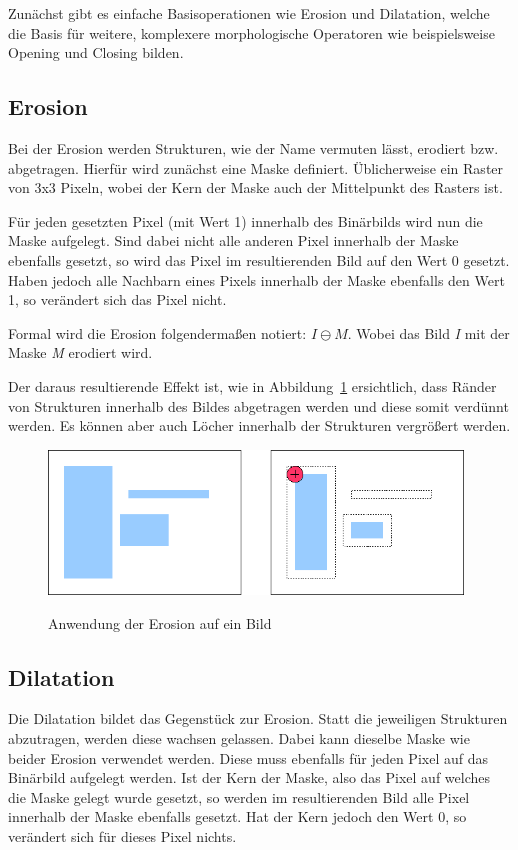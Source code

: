 Zunächst gibt es einfache Basisoperationen wie Erosion und Dilatation, welche die Basis für weitere, komplexere morphologische Operatoren wie beispielsweise Opening und Closing bilden.

\subsection{Erosion}
Bei der Erosion werden Strukturen, wie der Name vermuten lässt, erodiert bzw. abgetragen.
Hierfür wird zunächst eine Maske definiert. Üblicherweise ein Raster von 3x3 Pixeln, wobei der Kern der Maske auch der Mittelpunkt des Rasters ist.

Für jeden gesetzten Pixel (mit Wert 1) innerhalb des Binärbilds wird nun die Maske aufgelegt. Sind dabei nicht alle anderen Pixel innerhalb der Maske ebenfalls gesetzt, so wird das Pixel im resultierenden Bild auf den Wert 0 gesetzt.
Haben jedoch alle Nachbarn eines Pixels innerhalb der Maske ebenfalls den Wert 1, so verändert sich das Pixel nicht.

Formal wird die Erosion folgendermaßen notiert: $ I \ominus M $. Wobei das Bild {\em I} mit der Maske {\em M} erodiert wird.

Der daraus resultierende Effekt ist, wie in Abbildung~\ref{fig:Erosion} ersichtlich, dass Ränder von Strukturen innerhalb des Bildes abgetragen werden und diese somit verdünnt werden. Es können aber auch Löcher innerhalb der Strukturen vergrößert werden.

\begin{figure}[ht]
   \centering
     \includegraphics[width=11cm]{Bilder/MorphologicalErosion} \\
 \caption{Anwendung der Erosion auf ein Bild}
 \label{fig:Erosion}
\end{figure}

\subsection{Dilatation}
Die Dilatation bildet das Gegenstück zur Erosion. Statt die jeweiligen Strukturen abzutragen, werden diese wachsen gelassen.
Dabei kann dieselbe Maske wie beider Erosion verwendet werden. Diese muss ebenfalls für jeden Pixel auf das Binärbild aufgelegt werden. Ist der Kern der Maske, also das Pixel auf welches die Maske gelegt wurde gesetzt, so werden im resultierenden Bild alle Pixel innerhalb der Maske ebenfalls gesetzt. Hat der Kern jedoch den
Wert 0, so verändert sich für dieses Pixel nichts.

